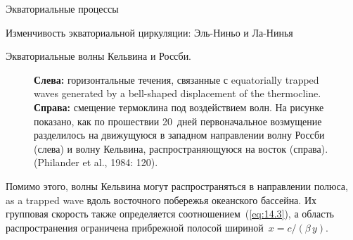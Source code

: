 \begin{chapter}{Экваториальные процессы}
\begin{section}{Изменчивость экваториальной циркуляции: Эль-Ниньо и Ла-Нинья}
\begin{paragraph}{Экваториальные волны Кельвина и Россби.}
\begin{figure}[t!]
\caption{\textbf{Слева:} горизонтальные течения, связанные с
equatorially trapped waves generated by a bell-shaped
displacement of the thermocline.
\textbf{Справа:} смещение термоклина под 
воздействием волн. На рисунке показано, как по прошествии 20~дней 
первоначальное возмущение разделилось на движущуюся в западном направлении
волну Россби (слева) и волну Кельвина,
распространяющуюся на восток (справа).
(Philander et al., 1984: 120).}
\label{fig:rossbycurrents}
\end{figure}
%
%

Помимо этого, волны Кельвина могут распространяться в направлении полюса,
as a trapped wave вдоль восточного побережья океанского бассейна. 
Их групповая скорость также определяется соотношением~(\ref{eq:14.3}), 
а область распространения ограничена прибрежной полосой 
шириной~$x=c/\left(\beta\,y\right)$.
%


\end{paragraph}
\end{section}
\end{chapter}
